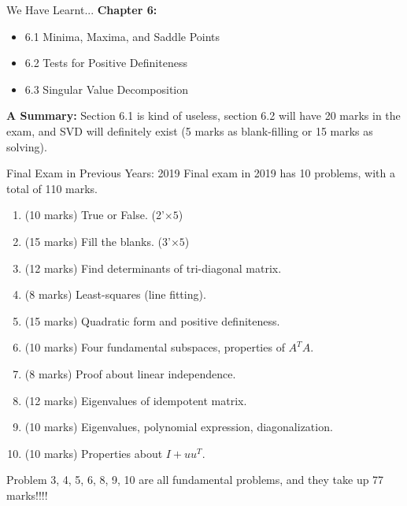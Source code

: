 \documentclass{beamer}
\begin{document}
\begin{frame}{We Have Learnt...}
\textbf{Chapter 6:}
\begin{itemize}
    \item 6.1 Minima, Maxima, and Saddle Points
    \item 6.2 Tests for Positive Definiteness
    \item 6.3 Singular Value Decomposition
\end{itemize}

\vspace{5pt}
\textbf{A Summary:} Section 6.1 is kind of useless, section 6.2 will have 20 marks in the exam, and SVD will definitely exist (5 marks as blank-filling or 15 marks as solving).

\end{frame}

\begin{frame}{Final Exam in Previous Years: 2019}
Final exam in 2019 has 10 problems, with a total of 110 marks.
\begin{enumerate}
    \item (10 marks) True or False. (2'$\times 5$)
    \item (15 marks) Fill the blanks. (3'$\times 5$)
    \item (12 marks) Find determinants of tri-diagonal matrix.
    \item (8 marks) Least-squares (line fitting).
    \item (15 marks) Quadratic form and positive definiteness.
    \item (10 marks) Four fundamental subspaces, properties of $A^TA$.
    \item (8 marks) Proof about linear independence.
    \item (12 marks) Eigenvalues of idempotent matrix.
    \item (10 marks) Eigenvalues, polynomial expression, diagonalization.
    \item (10 marks) Properties about $I+uu^T$.
\end{enumerate}

\vspace{3pt}
Problem 3, 4, 5, 6, 8, 9, 10 are all fundamental problems, and they take up 77 marks!!!!
\end{frame}
\end{document}
